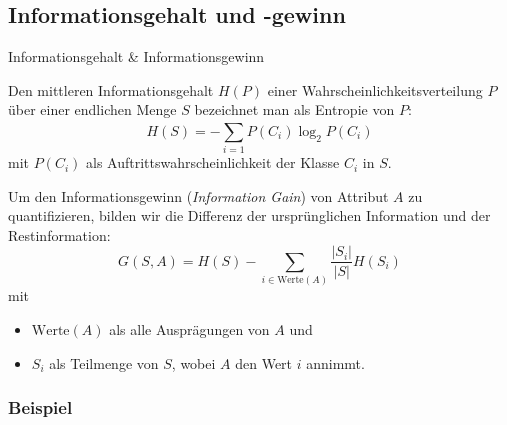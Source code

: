\subsection{Informationsgehalt und -gewinn}

\begin{frame}{Informationsgehalt \& Informationsgewinn}
\begin{Definition}

Den mittleren Informationsgehalt $H(P)$ einer Wahrscheinlichkeitsverteilung $P$ über einer endlichen Menge $S$ bezeichnet man als Entropie von $P$:
\begin{equation*}
    H(S) = - \sum_{i=1}^{} P(C_i) \log_2 P(C_i)
\end{equation*}
mit $P(C_i)$ als Auftrittswahrscheinlichkeit der Klasse $C_i$ in $S$.

\end{Definition}

\pause

\begin{Definition}
Um den Informationsgewinn (\textit{Information Gain}) von Attribut $A$ zu quantifizieren, bilden wir die Differenz der ursprünglichen Information und der Restinformation:
\begin{equation*}
G(S, A) = H(S) - \sum_{i \in \text{Werte}(A)} \frac{|S_i|}{|S|}H(S_i)
\end{equation*}
mit \begin{itemize}
 \item $\text{Werte}(A)$ als alle Ausprägungen von $A$ und
 \item $S_i$ als Teilmenge von $S$, wobei $A$ den Wert $i$ annimmt.
 \end{itemize}

\end{Definition}


\end{frame}

\subsubsection{Beispiel}


